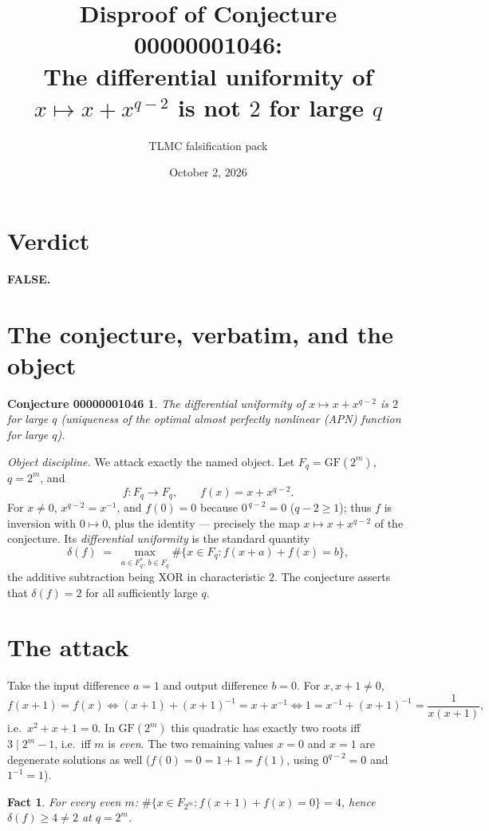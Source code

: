 \documentclass[11pt]{article}
\title{Disproof of Conjecture 00000001046:\\
The differential uniformity of $x \mapsto x+x^{q-2}$ is not $2$ for large $q$}
\author{TLMC falsification pack}
\date{October 2, 2026}
\newtheorem*{conj*}{Conjecture 00000001046}
\newtheorem{fact}{Fact}
\begin{document}
\maketitle

\section*{Verdict}
\textbf{FALSE.}

\section{The conjecture, verbatim, and the object}

\begin{conj*}
The differential uniformity of $x \mapsto x+x^{q-2}$ is $2$ for large $q$
(uniqueness of the optimal almost perfectly nonlinear (APN) function for large $q$).
\end{conj*}

\noindent\emph{Object discipline.} We attack exactly the named object. Let
$F_q = \mathrm{GF}(2^m)$, $q = 2^m$, and
\[
f \colon F_q \to F_q, \qquad f(x) = x + x^{q-2}.
\]
For $x \neq 0$, $x^{q-2} = x^{-1}$, and $f(0) = 0$ because $0^{\,q-2} = 0$
($q-2 \ge 1$); thus $f$ is inversion with $0 \mapsto 0$, plus the identity ---
precisely the map $x \mapsto x + x^{q-2}$ of the conjecture. Its
\emph{differential uniformity} is the standard quantity
\[
\delta(f) \;=\; \max_{a \in F_q^{*},\, b \in F_q} \#\{x \in F_q : f(x+a) + f(x) = b\},
\]
the additive subtraction being XOR in characteristic $2$. The conjecture asserts
that $\delta(f) = 2$ for all sufficiently large $q$.

\section{The attack}

Take the input difference $a = 1$ and output difference $b = 0$. For
$x, x+1 \neq 0$,
\[
f(x+1) = f(x) \iff (x+1) + (x+1)^{-1} = x + x^{-1}
\iff 1 = x^{-1} + (x+1)^{-1} = \frac{1}{x(x+1)},
\]
i.e.\ $x^2 + x + 1 = 0$. In $\mathrm{GF}(2^m)$ this quadratic has exactly two
roots iff $3 \mid 2^m - 1$, i.e.\ iff $m$ is \emph{even}. The two remaining
values $x = 0$ and $x = 1$ are degenerate solutions as well
($f(0) = 0 = 1 + 1 = f(1)$, using $0^{q-2} = 0$ and $1^{-1} = 1$).

\begin{fact}\label{fac:even}
For every even $m$:
$\#\{x \in F_{2^m} : f(x+1) + f(x) = 0\} = 4$, hence
$\delta(f) \ge 4 \ne 2$ at $q = 2^m$.
\end{fact}
\end{document}
